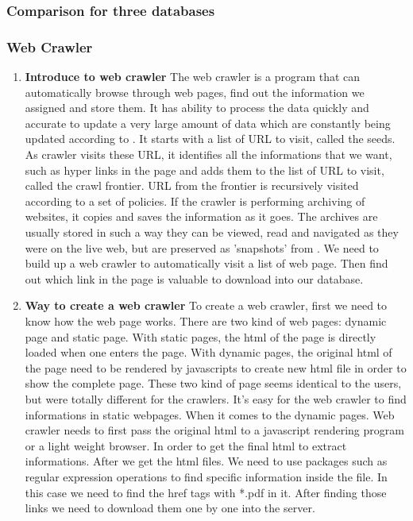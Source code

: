 \subsubsection{Comparison for three databases}



\subsubsection{Web Crawler}
\begin{enumerate}
	
	\item\textbf{Introduce to web crawler}
	\setlength{\parindent}{1em}	
	The web crawler is a program that can automatically browse through web pages, find out the information we assigned and store them.
	It has ability to process the data quickly and accurate to update a very large amount of data which are constantly being updated according to \cite{Liu2012}.
	It starts with a list of URL to visit, called the seeds.
	As crawler visits these URL, it identifies all the informations that we want, such as hyper links in the page and adds them to the list of URL to visit, called the crawl frontier.
	URL from the frontier is recursively visited according to a set of policies.
	If the crawler is performing archiving of websites, it copies and saves the information as it goes.
	The archives are usually stored in such a way they can be viewed, read and navigated as they were on the live web, but are preserved as 'snapshots' from \cite{Du2013}.
	We need to build up a web crawler to automatically visit a list of web page.
	Then find out which link in the page is valuable to download into our database.
	
	\item\textbf{Way to create a web crawler}
	\setlength{\parindent}{1em}	
	To create a web crawler, first we need to know how the web page works. 
	There are two kind of web pages: dynamic page and static page.
	With static pages, the html of the page is directly loaded when one enters the page.
	With dynamic pages, the original html of the page need to be rendered by javascripts to create new html file in order to show the complete page.
	These two kind of page seems identical to the users, but were totally different for the crawlers.
	It's easy for the web crawler to find informations in static webpages.
	When it comes to the dynamic pages. 
	Web crawler needs to first pass the original html to a javascript rendering program or a light weight browser. 
	In order to get the final html to extract informations.
	After we get the html files.
	We need to use packages such as regular expression operations to find specific information inside the file.
	In this case we need to find the href tags with *.pdf in it.
	After finding those links we need to download them one by one into the server.	
	
\end{enumerate}

